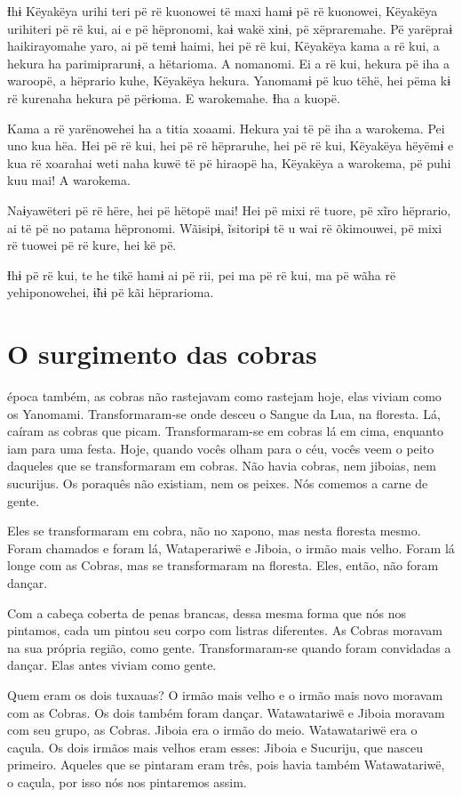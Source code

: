 Ɨhɨ Këyakëya urihi teri pë rë kuonowei të maxi hamɨ pë rë kuonowei,
Këyakëya urihiteri pë rë kui, ai e pë hëpronomi, kaɨ wakë xinɨ, pë
xëpraremahe. Pë yarëpraɨ haikirayomahe yaro, ai pë temɨ haimi, hei pë rë
kui, Këyakëya kama a rë kui, a hekura ha parimiprarunɨ, a hëtarioma. A nomanomi. Ei a rë kui, hekura pë iha a waroopë, a hëprario kuhe,
Këyakëya hekura. Yanomamɨ pë kuo tëhë, hei pëma kɨ rë kurenaha hekura pë
përɨoma. E warokemahe. Ɨha a kuopë. 

Kama a rë yarënowehei ha a titia xoaami. Hekura yai të pë iha a
warokema. Pei uno kua hëa. Hei pë rë kui, hei pë rë hëpraruhe, hei pë rë
kui, Këyakëya hëyëmɨ e kua rë xoarahai weti naha kuwë të pë hiraopë ha,
Këyakëya a warokema, pë puhi kuu mai! A warokema. 

Naɨyawëteri pë rë hëre, hei pë hëtopë mai! Hei pë mixi rë tuore, pë xĩro
hëprario, ai të pë no patama hëpronomi. Wãisipɨ, ĩsitoripɨ të u wai rë
õkimouwei, pë mixi rë tuowei pë rë kure, hei kë pë. 

Ɨhɨ pë rë kui, te he tikë hamɨ ai pë rii, pei ma pë rë kui, ma pë wãha
rë yehiponowehei, ɨ̃hɨ pë kãi hëprarioma.

\chapter{O surgimento das cobras}
 
 época também, as cobras não rastejavam como rastejam hoje, elas
viviam como os Yanomami. Transformaram-se onde desceu o Sangue da Lua,
na floresta. Lá, caíram as cobras que picam. Transformaram-se em cobras
lá em cima, enquanto iam para uma festa. Hoje, quando vocês olham para o
céu, vocês veem o peito daqueles que se transformaram em cobras. Não
havia cobras, nem jiboias, nem sucurijus. Os poraquês não existiam, nem
os peixes. Nós comemos a carne de gente.

Eles se transformaram em cobra, não no xapono, mas nesta floresta mesmo.
Foram chamados e foram lá, Wataperariwë e Jiboia, o irmão mais velho.
Foram lá longe com as Cobras, mas se transformaram na floresta. Eles,
então, não foram dançar. 

Com a cabeça coberta de penas brancas, dessa mesma forma que nós nos
pintamos, cada um pintou seu corpo com listras diferentes. As Cobras
moravam na sua própria região, como gente. Transformaram-se quando
foram convidadas a dançar. Elas antes viviam como gente. 

Quem eram os dois tuxauas? O irmão mais velho e o irmão mais novo
moravam com as Cobras. Os dois também foram dançar. Watawatariwë e
Jiboia moravam com seu grupo, as Cobras. Jiboia era o irmão do meio.
Watawatariwë era o caçula. Os dois irmãos mais velhos eram esses: Jiboia
e Sucuriju, que nasceu primeiro. Aqueles que se pintaram eram três, pois
havia também Watawatariwë, o caçula, por isso nós nos pintaremos assim. 

